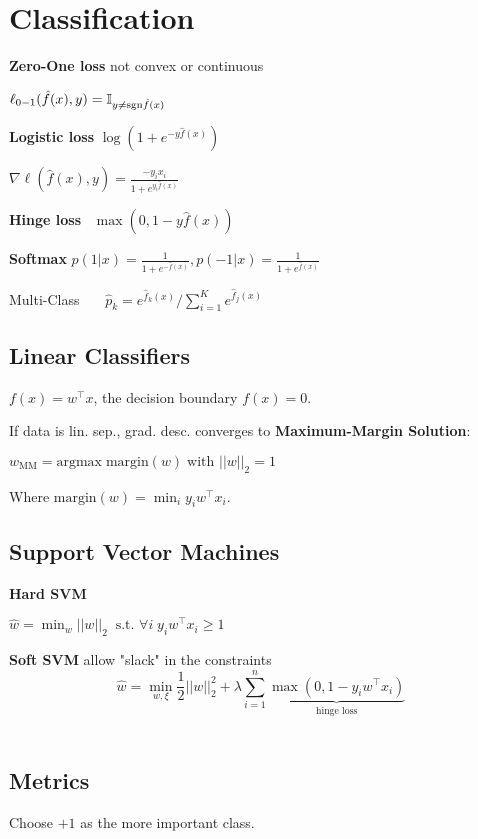 \section*{Classification}

\textbf{Zero-One loss} \quad not convex or continuous

\qquad \qquad $\ell_{0-1}(\hat{f}(x), y) = \mathbb{I}_{y \neq \text{sgn} \hat{f}(x)}$

\textbf{Logistic loss} \quad $\log(1 + e^{-y \hat{f}(x)})$

\qquad \qquad $\nabla \ell(\hat{f}(x), y) = \frac{-y_i x_i}{1 + e^{y_i \hat{f}(x)}}$

\textbf{Hinge loss} \quad \ $\max(0, 1-y \hat{f}(x))$

\textbf{Softmax} $p(1 | x) = \frac{1}{1 + e^{- \hat{f}(x)}}, p(-1 | x) = \frac{1}{1 + e^{\hat{f}(x)}}$ 

Multi-Class \ \ \ $\hat{p}_k = e^{\hat{f}_k(x)} / \sum_{i=1}^K e^{\hat{f}_j(x)}$

\subsection*{Linear Classifiers}

$f(x) = w^\top x$, the decision boundary $f(x) = 0$. \smallskip

If data is lin. sep., grad. desc. converges to \textbf{Maximum-Margin Solution}: 

\quad $w_\text{MM} = \text{argmax} \; \text{margin} (w) \; \text{with } ||w||_2 = 1$

Where $\text{margin} (w) = \min_i y_i w^\top x_i$.
 
\subsection*{Support Vector Machines}
\textbf{Hard SVM}

\qquad $\hat{w} = \min_w ||w||_2 \; \; \text{s.t. } \forall i \;y_i w^\top x_i \geq 1$
 
\textbf{Soft SVM} \quad allow "slack" in the constraints
$$\hat{w} = \min_{w, \xi} \frac{1}{2} ||w||_2^2 + \lambda \sum_{i=1}^n \underbrace{\max (0, 1 - y_i w^\top x_i)}_{\text{hinge loss}}$$ \\[-20pt]

\subsection*{Metrics} 
Choose $+1$ as the more important class. 

